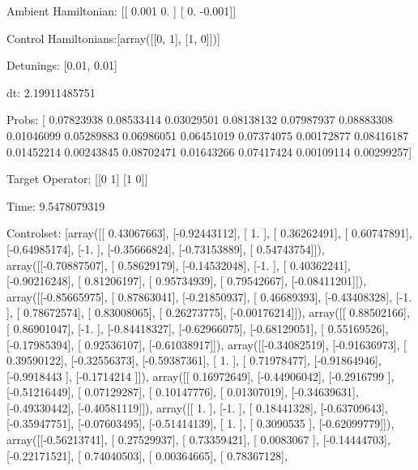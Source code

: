 \documentclass{article}
\begin{document}
    

\newpage

Ambient Hamiltonian: [[ 0.001  0.   ]
 [ 0.    -0.001]]

Control Hamiltonians:[array([[0, 1],
       [1, 0]])]

Detunings: [0.01, 0.01]

 dt: 2.19911485751

Probs: [ 0.07823938  0.08533414  0.03029501  0.08138132  0.07987937  0.08883308
  0.01046099  0.05289883  0.06986051  0.06451019  0.07374075  0.00172877
  0.08416187  0.01452214  0.00243845  0.08702471  0.01643266  0.07417424
  0.00109114  0.00299257]

Target Operator: [[0 1]
 [1 0]]

Time: 9.5478079319

Controlset: [array([[ 0.43067663],
       [-0.92443112],
       [ 1.        ],
       [ 0.36262491],
       [ 0.60747891],
       [-0.64985174],
       [-1.        ],
       [-0.35666824],
       [-0.73153889],
       [ 0.54743754]]), array([[-0.70887507],
       [ 0.58629179],
       [-0.14532048],
       [-1.        ],
       [ 0.40362241],
       [-0.90216248],
       [ 0.81206197],
       [ 0.95734939],
       [ 0.79542667],
       [-0.08411201]]), array([[-0.85665975],
       [ 0.87863041],
       [-0.21850937],
       [ 0.46689393],
       [-0.43408328],
       [-1.        ],
       [ 0.78672574],
       [ 0.83008065],
       [ 0.26273775],
       [-0.00176214]]), array([[ 0.88502166],
       [ 0.86901047],
       [-1.        ],
       [-0.84418327],
       [-0.62966075],
       [-0.68129051],
       [ 0.55169526],
       [-0.17985394],
       [ 0.92536107],
       [-0.61038917]]), array([[-0.34082519],
       [-0.91636973],
       [ 0.39590122],
       [-0.32556373],
       [-0.59387361],
       [ 1.        ],
       [ 0.71978477],
       [-0.91864946],
       [-0.9918443 ],
       [-0.1714214 ]]), array([[ 0.16972649],
       [-0.44906042],
       [-0.2916799 ],
       [-0.51216449],
       [ 0.07129287],
       [ 0.10147776],
       [ 0.01307019],
       [-0.34639631],
       [-0.49330442],
       [-0.40581119]]), array([[ 1.        ],
       [-1.        ],
       [ 0.18441328],
       [-0.63709643],
       [-0.35947751],
       [-0.07603495],
       [-0.51414139],
       [ 1.        ],
       [ 0.3090535 ],
       [-0.62099779]]), array([[-0.56213741],
       [ 0.27529937],
       [ 0.73359421],
       [ 0.0083067 ],
       [-0.14444703],
       [-0.22171521],
       [ 0.74040503],
       [ 0.00364665],
       [ 0.78367128],
\end{document}
